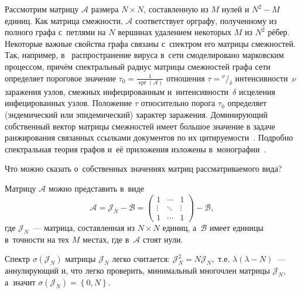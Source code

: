 Рассмотрим матрицу \( \mathscr{A} \) размера \( N\times N \),
 составленную из \( M \) нулей и \( N^2 - M \) единиц.
Как матрица смежности, \( \mathscr{A} \) соответствует орграфу,
 полученному из полного графа с~петлями на \( N \) вершинах
 удалением некоторых \( M \) из \( N^2 \) р\"ебер.
Некоторые важные свойства графа связаны с~спектром его матрицы смежностей.
Так, например, в~\cite{wang2003epidemic,chakrabarti2008epidemic}
 распространение вируса в~сети смоделировано марковским процессом,
 причём спектральный радиус матрицы смежностей графа сети
 определяет пороговое значение
 \( \tau_0=\frac{1}{\operatorname{spr}(\mathscr{A})} \)
 отношения \( \tau = {^\nu/_\delta} \)
 интенсивности~\( \nu \) заражения узлов, смежных инфецированным
 и~интенсивности~\( \delta \) исцеления инфецированных узлов.
 Положение \(\tau\) относительно порога \({\tau_0}\) определяет
 (эндемический или эпидемический) характер заражения.
Доминирующий собственный вектор матрицы смежностей
имеет большое значение в задаче
ранжирования связанных ссылками документов
по их цитируемости~\cite{bonacich1972factoring,ilprints422}.
Подробно спектральная теория графов и~е\"е приложения
изложены в~монографии~\cite{cvetkovic1980spectra}.

Что можно сказать о~собственных значениях матриц рассматриваемого вида?

Матрицу \( \mathscr{A} \) можно представить в~виде
\[ \mathscr{A} = \mathcal{J}_N - \mathscr{B} =
    \begin{pmatrix}1 & \cdots & 1\\ \vdots & \ddots & \vdots \\ 1 & \cdots & 1\end{pmatrix} - \mathscr{B}, \]
 где \( \mathcal{J}_N \)~--- матрица, составленная из \( N\times N \) единиц,
 а~\( \mathscr{B} \) имеет единицы в~точности на тех \( M \) местах,
 где в~\( \mathscr{A} \) стоят нули.

Спектр \( \sigma\left( \mathcal{J}_N \right) \)
 матрицы \( \mathcal{J}_N \) легко считается:
 \( \mathcal{J}_N^2 = N \mathcal{J}_N, \) т.е.
 \( \lambda(\lambda - N) \)~--- аннулирующий и, что легко проверить,
 минимальный многочлен матрицы \( \mathcal{J}_N \), а~значит
 \( \sigma\left( \mathcal{J}_N \right) = \left\{ 0,N \right\}. \)

